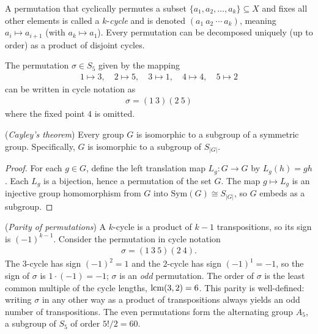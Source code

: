 \documentclass[a4paper, 12pt]{book} %
\begin{document}
\begin{definition}
    A permutation that cyclically permutes a subset $\{a_1, a_2, \ldots, a_k\} \subseteq X$ and fixes all other elements is called a $k$-\emph{cycle} and is denoted $(a_1~a_2~\cdots~a_k)$, meaning $a_i \mapsto a_{i+1}$ (with $a_k \mapsto a_1$). Every permutation can be decomposed uniquely (up to order) as a product of disjoint cycles.
\end{definition}

\begin{example}
    The permutation $\sigma \in S_5$ given by the mapping
    \begin{align}
        1 \mapsto 3, \quad 2 \mapsto 5, \quad 3 \mapsto 1, \quad 4 \mapsto 4, \quad 5 \mapsto 2
    \end{align}
    can be written in cycle notation as
    \begin{align}
        \sigma = (1~3)(2~5)
    \end{align}
    where the fixed point $4$ is omitted.
\end{example}

\begin{theorem}
    (\emph{Cayley's theorem}) Every group $G$ is isomorphic to a subgroup of a symmetric group. Specifically, $G$ is isomorphic to a subgroup of $S_{|G|}$.
\end{theorem}

\begin{proof}
    For each $g \in G$, define the left translation map $L_g: G \longrightarrow G$ by $L_g(h) = gh$. Each $L_g$ is a bijection, hence a permutation of the set $G$. The map $g \mapsto L_g$ is an injective group homomorphism from $G$ into $\mathrm{Sym}(G) \cong S_{|G|}$, so $G$ embeds as a subgroup.
\end{proof}

\begin{example}
    (\emph{Parity of permutations}) A $k$-cycle is a product of $k-1$ transpositions, so its sign is $(-1)^{k-1}$. Consider the permutation in cycle notation
    \begin{align}
        \sigma = (1~3~5)(2~4).
    \end{align}
    The $3$-cycle has sign $(-1)^{2} = 1$ and the $2$-cycle has sign $(-1)^1 = -1$, so the sign of $\sigma$ is $1 \cdot (-1) = -1$; $\sigma$ is an \emph{odd} permutation. The order of $\sigma$ is the least common multiple of the cycle lengths, $\mathrm{lcm}(3,2) = 6$. This parity is well-defined: writing $\sigma$ in any other way as a product of transpositions always yields an odd number of transpositions. The even permutations form the alternating group $A_5$, a subgroup of $S_5$ of order $5!/2 = 60$.
\end{example}
\end{document}
